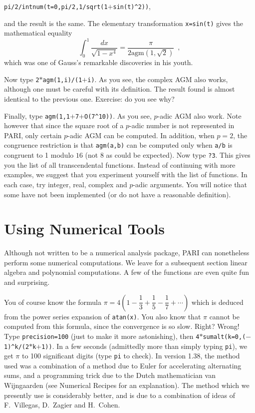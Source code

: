 {\tt pi/2/intnum(t=0,pi/2,1/sqrt(1$+$sin(t)\^{}2))},

and the result is the same. The elementary transformation {\tt x=sin(t)}
gives the mathematical equality
$$\int_0^1\dfrac{dx}{\sqrt{1-x^4}}=\dfrac{\pi}{2\text{agm}(1,\sqrt2)}\enspace,$$
which was one of Gauss's remarkable discoveries in his youth.

Now type {\tt 2$*$agm(1,i)/(1$+$i)}. As you see, the complex AGM also works, 
although one must be careful with its definition. The result found is
almost identical to the previous one. Exercise: do you see why?

Finally, type {\tt agm(1,1$+$7$+$O(7\^{}10))}. As you see, $p$-adic AGM also
work. Note however that since the square root of a $p$-adic number is not
represented in PARI, only certain $p$-adic AGM can be computed. In addition,
when $p=2$, the congruence restriction is that {\tt agm(a,b)} can be computed
only when {\tt a/b} is congruent to 1 modulo $16$ (not 8 as could be expected).
\smallskip
Now type {\tt ?3}. This gives you the list of all transcendental functions.
Instead of continuing with more examples, we suggest that you experiment
yourself with the list of functions. In each case, try integer, real, complex
and $p$-adic arguments. You will notice that some have not been implemented
(or do not have a reasonable definition).
\medskip
\section{Using Numerical Tools}
\medskip
Although not written to be a numerical analysis package, PARI can nonetheless
perform some numerical computations. We leave for a subsequent section
linear algebra and polynomial computations. A few of the functions are even
quite fun and surprising.

You of course know the formula $\pi=4(1-\dfrac13+\dfrac15-\dfrac17+\cdots)$
which is deduced from the power series expansion of {\tt atan(x)}. You also
know that $\pi$ cannot be computed from this formula, since the convergence
is so slow. Right? Wrong! Type {\tt\bs precision=100} (just to make it
more astonishing), then {\tt 4$*$sumalt(k=0,($-$1)\^{}k/(2$*$k$+$1))}. In a
few seconds (admittedly more than simply typing {\tt pi}), we get $\pi$ to
100 significant digits (type {\tt pi} to check). In version 1.38, the method
used was a combination of a method due to Euler for accelerating alternating 
sums, and a programming trick due to the Dutch mathematician van Wijngaarden
(see Numerical Recipes for an explanation). The method which we presently
use is considerably better, and is due to a combination of ideas of 
F.~Villegas, D.~Zagier and H.~Cohen.

